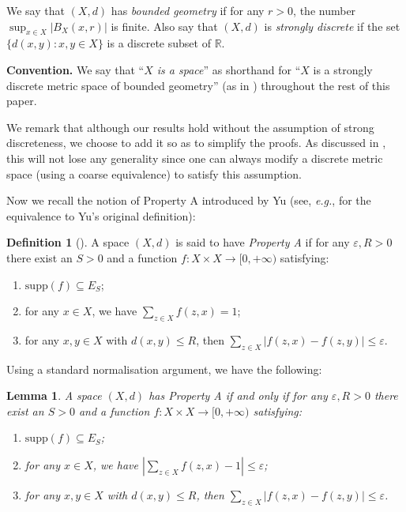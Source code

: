 \documentclass[12pt, a4paper]{amsart}
\numberwithin{equation}{section}
\newtheorem{lem}[thm]{Lemma}
\theoremstyle{definition}
\newtheorem{defn}[thm]{Definition}
\newtheorem{conv}[thm]{Convention}
\theoremstyle{remark}
\def\RR{\mathbb{R}}
\def\supp{\mathrm{supp}}
\begin{document}
We say that $(X,d)$ has \emph{bounded geometry} if for any $r>0$, the number $\sup_{x\in X} |B_{X}(x,r)|$ is finite. Also say that $(X,d)$ is \emph{strongly discrete} if the set $\{d(x,y): x,y \in X\}$ is a discrete subset of $\RR$. 


\noindent \textbf{Convention.} We say that ``\emph{$X$ is a space}'' as shorthand for ``$X$ is a strongly discrete metric space of bounded geometry'' (as in \cite{SW17}) throughout the rest of this paper. 

We remark that although our results hold without the assumption of strong discreteness, we choose to add it so as to simplify the proofs. As discussed in \cite[Section 2]{SW17}, this will not lose any generality since one can always modify a discrete metric space (using a coarse equivalence) to satisfy this assumption.



Now we recall the notion of Property A introduced by Yu (see, \emph{e.g.}, \cite[Proposition 1.2.4]{Wil09} for the equivalence to Yu’s original definition):

\begin{defn}[\cite{Yu00}]\label{defn: Property A}
A space $(X,d)$ is said to have \emph{Property A} if for any $\varepsilon, R>0$ there exist an $S>0$ and a function $f: X \times X \to [0,+\infty)$ satisfying:
\begin{enumerate}
  \item $\supp(f) \subseteq E_S$;
  \item for any $x\in X$, we have $\sum_{z\in X} f(z,x) =1$;
  \item for any $x,y\in X$ with $d(x,y) \leq R$, then $\sum_{z\in X} |f(z,x) - f(z,y)| \leq \varepsilon$.
\end{enumerate}
\end{defn}


Using a standard normalisation argument, we have the following:

\begin{lem}\label{lem:char for A}
A space $(X,d)$ has Property A \emph{if and only if} for any $\varepsilon, R>0$ there exist an $S>0$ and a function $f: X \times X \to [0,+\infty)$ satisfying:
\begin{enumerate}
  \item $\supp(f) \subseteq E_S$;
  \item for any $x\in X$, we have $|\sum_{z\in X} f(z,x) - 1 | \leq \varepsilon$;
  \item for any $x,y\in X$ with $d(x,y) \leq R$, then $\sum_{z\in X} |f(z,x) - f(z,y)| \leq \varepsilon$.
\end{enumerate}
\end{lem}
\end{document}
